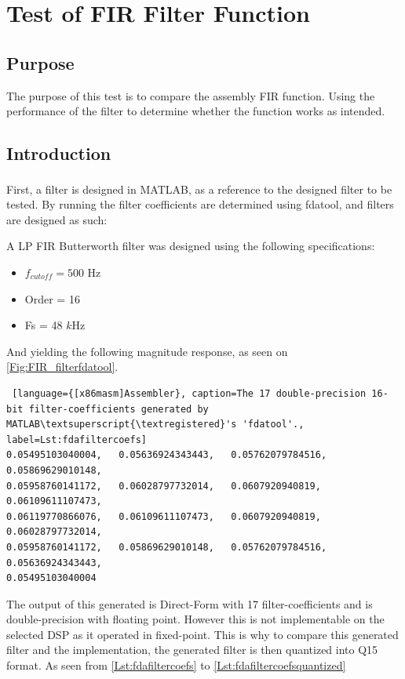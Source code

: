 \section{Test of FIR Filter Function}

\subsection{Purpose}
The purpose of this test is to compare the assembly FIR function. Using the performance of the filter to determine whether the function works as intended.

\subsection{Introduction}
First, a filter is designed in MATLAB\textsuperscript{\textregistered}, as a reference to the designed filter to be tested. By running  the filter coefficients are determined using fdatool, and filters are designed as such:

A LP FIR Butterworth filter was designed using the following specifications:

\begin{itemize}
	\item $f_{cutoff} = 500$ Hz
	\item Order = 16
	\item Fs = 48 $k$Hz
\end{itemize}


And yielding the following magnitude response, as seen on \autoref{Fig:FIR_filterfdatool}.

\begin{lstlisting} [language={[x86masm]Assembler}, caption=The 17 double-precision 16-bit filter-coefficients generated by MATLAB\textsuperscript{\textregistered}'s 'fdatool'., label=Lst:fdafiltercoefs]
0.05495103040004,	0.05636924343443,	0.05762079784516,	0.05869629010148,
0.05958760141172,	0.06028797732014,	0.0607920940819,	0.06109611107473,
0.06119770866076,	0.06109611107473,	0.0607920940819,	0.06028797732014,
0.05958760141172,	0.05869629010148,	0.05762079784516,	0.05636924343443,
0.05495103040004
\end{lstlisting}


The output of this generated is Direct-Form with 17 filter-coefficients and is double-precision with floating point. However this is not implementable on the selected DSP as it operated in fixed-point. This is why to compare this generated filter and the implementation, the generated filter is then quantized into Q15 format. As seen from \autoref{Lst:fdafiltercoefs} to \autoref{Lst:fdafiltercoefsquantized}

